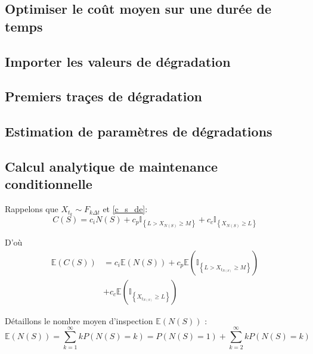 \documentclass[10pt,a4paper]{article}
\begin{document}
\subsection{Optimiser le coût moyen sur une durée de temps}
\label{annexe:optim_e_c}

\subsection{Importer les valeurs de dégradation}
\label{annexe:import_degrad}

\subsection{Premiers traçes de dégradation}
\label{annexe:premier_plot_degrad}

\subsection{Estimation de paramètres de dégradations}
\label{annexe:estim_degrad}

\subsection{Calcul analytique de maintenance conditionnelle}
\label{annexe:ana_e_c}
Rappelons que ${X_{{t_k}}} \sim {F_{k\Delta t}}$ et \eqref{c_s_de}:
\[C\left( S \right) = {c_i}N\left( S \right) + {c_p}{\mathbb{I}_{\left\{ {L > {X_{N\left( S \right)}} \geqslant M} \right\}}} + {c_c}{\mathbb{I}_{\left\{ {{X_{N\left( S \right)}} \geqslant L} \right\}}}\]

D'où
\begin{align*}
    \label{e_c_s_de}
    \mathbb{E}\left( {C\left( S \right)} \right) & = {c_i}\mathbb{E}\left( {N\left( S \right)} \right) + {c_p}\mathbb{E}\left( {{\mathbb{I}_{\left\{ {L > {X_{{t_{N\left( S \right)}}}} \geqslant M} \right\}}}} \right) \\
    & + {c_c}\mathbb{E}\left( {{\mathbb{I}_{\left\{ {{X_{{t_{N\left( S \right)}}}} \geqslant L} \right\}}}} \right)
\end{align*}

Détaillons le nombre moyen d'inspection $\mathbb{E}\left( {N\left( S \right)} \right)$ :
\[\mathbb{E}\left( {N\left( S \right)} \right) = \sum\limits_{k = 1}^\infty  {kP\left( {N\left( S \right) = k} \right)}  = P\left( {N\left( S \right) = 1} \right) + \sum\limits_{k = 2}^\infty  {kP\left( {N\left( S \right) = k} \right)} \]
\end{document}
